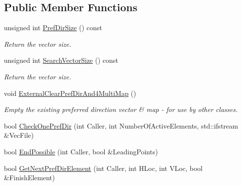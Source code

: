 \subsection*{Public Member Functions}
\begin{DoxyCompactItemize}
\item 
\mbox{\label{class_t_one_pref_dir_a29d013bf730e23d27fdb2c390e3a14da}} 
unsigned int \mbox{\hyperlink{class_t_one_pref_dir_a29d013bf730e23d27fdb2c390e3a14da}{Pref\+Dir\+Size}} () const
\begin{DoxyCompactList}\small\item\em Return the vector size. \end{DoxyCompactList}\item 
\mbox{\label{class_t_one_pref_dir_a7a7fb4b5ae1ed73c9a989d21980d5b54}} 
unsigned int \mbox{\hyperlink{class_t_one_pref_dir_a7a7fb4b5ae1ed73c9a989d21980d5b54}{Search\+Vector\+Size}} () const
\begin{DoxyCompactList}\small\item\em Return the vector size. \end{DoxyCompactList}\item 
\mbox{\label{class_t_one_pref_dir_abc09de3c32460a73d3de12625329210d}} 
void \mbox{\hyperlink{class_t_one_pref_dir_abc09de3c32460a73d3de12625329210d}{External\+Clear\+Pref\+Dir\+And4\+Multi\+Map}} ()
\begin{DoxyCompactList}\small\item\em Empty the existing preferred direction vector \& map -\/ for use by other classes. \end{DoxyCompactList}\item 
bool \mbox{\hyperlink{class_t_one_pref_dir_a1896affce3465b84cfd5128cca122639}{Check\+One\+Pref\+Dir}} (int Caller, int Number\+Of\+Active\+Elements, std\+::ifstream \&Vec\+File)
\item 
bool \mbox{\hyperlink{class_t_one_pref_dir_a7b81a1377e6269aafad6c25c929b2852}{End\+Possible}} (int Caller, bool \&Leading\+Points)
\item 
bool \mbox{\hyperlink{class_t_one_pref_dir_a06cd3491535362fccbba4e76b9a120e9}{Get\+Next\+Pref\+Dir\+Element}} (int Caller, int H\+Loc, int V\+Loc, bool \&Finish\+Element)
\item 
\mbox{\label{class_t_one_pref_dir_a0acdc81183b894d1d6aecb5f563efefc}} 

\end{DoxyCompactItemize}

